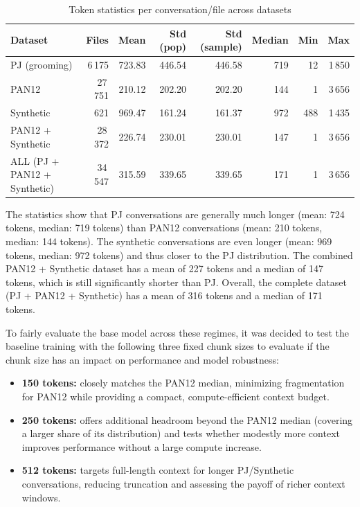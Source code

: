 \begin{table}[htbp]
\centering
\caption{Token statistics per conversation/file across datasets}
\label{tab:token_stats}
\begin{tabular}{lrrrrrrr}
\toprule
\textbf{Dataset} & \textbf{Files} & \textbf{Mean} & \textbf{Std (pop)} & \textbf{Std (sample)} & \textbf{Median} & \textbf{Min} & \textbf{Max} \\
\midrule
PJ (grooming)                & 6\,175  & 723.83 & 446.54 & 446.58 & 719  & 12  & 1\,850 \\
PAN12                        & 27\,751 & 210.12 & 202.20 & 202.20 & 144  & 1   & 3\,656 \\
Synthetic                    & 621     & 969.47 & 161.24 & 161.37 & 972  & 488 & 1\,435 \\
PAN12 + Synthetic            & 28\,372 & 226.74 & 230.01 & 230.01 & 147  & 1   & 3\,656 \\
ALL (PJ + PAN12 + Synthetic) & 34\,547 & 315.59 & 339.65 & 339.65 & 171  & 1   & 3\,656 \\
\bottomrule
\end{tabular}
\end{table}

The statistics show that PJ conversations are generally much longer (mean: 724 tokens, median: 719 tokens) than PAN12 conversations (mean: 210 tokens, median: 144 tokens). The synthetic conversations are even longer (mean: 969 tokens, median: 972 tokens) and thus closer to the PJ distribution. The combined PAN12 + Synthetic dataset has a mean of 227 tokens and a median of 147 tokens, which is still significantly shorter than PJ. Overall, the complete dataset (PJ + PAN12 + Synthetic) has a mean of 316 tokens and a median of 171 tokens.

To fairly evaluate the base model across these regimes, it was decided to test the baseline training with the following three fixed chunk sizes to evaluate if the chunk size has an impact on performance and model robustness:
\begin{itemize}
  \item \textbf{150 tokens:} closely matches the PAN12 median, minimizing fragmentation for PAN12 while providing a compact, compute-efficient context budget.
  \item \textbf{250 tokens:} offers additional headroom beyond the PAN12 median (covering a larger share of its distribution) and tests whether modestly more context improves performance without a large compute increase.
  \item \textbf{512 tokens:} targets full-length context for longer PJ/Synthetic conversations, reducing truncation and assessing the payoff of richer context windows.
\end{itemize}

